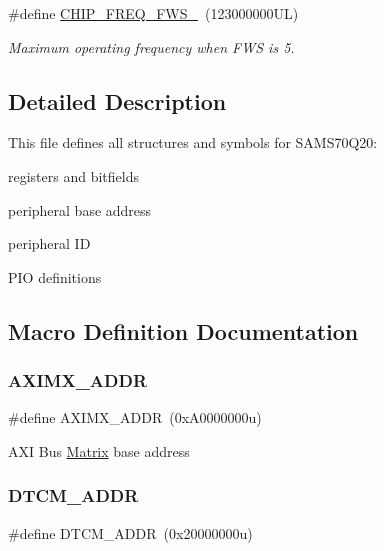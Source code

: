 \begin{DoxyCompactItemize}
\mbox{\label{group__SAMS70Q20__definitions_ga3b66824f858591135877b369f98d48a5}} 
\#define \mbox{\hyperlink{group__SAMS70Q20__definitions_ga3b66824f858591135877b369f98d48a5}{C\+H\+I\+P\+\_\+\+F\+R\+E\+Q\+\_\+\+F\+W\+S\+\_}}~(123000000\+U\+L)
\begin{DoxyCompactList}\small\item\em Maximum operating frequency when F\+WS is 5. \end{DoxyCompactList}\end{DoxyCompactItemize}


\subsection{Detailed Description}
This file defines all structures and symbols for S\+A\+M\+S70\+Q20\+:
\begin{DoxyItemize}
\item registers and bitfields
\item peripheral base address
\item peripheral ID
\item P\+IO definitions 
\end{DoxyItemize}

\subsection{Macro Definition Documentation}
\mbox{\label{group__SAMS70Q20__definitions_ga2fb7cc681bf5e7fbce5e3635b72a330a}} 
\subsubsection{\texorpdfstring{AXIMX\_ADDR}{AXIMX\_ADDR}}
{\footnotesize\ttfamily \#define A\+X\+I\+M\+X\+\_\+\+A\+D\+DR~(0x\+A0000000u)}

A\+XI Bus \mbox{\hyperlink{structMatrix}{Matrix}} base address \mbox{\label{group__SAMS70Q20__definitions_ga26626a425f7ebb3a0c2dbc276f0d9f78}} 
\subsubsection{\texorpdfstring{DTCM\_ADDR}{DTCM\_ADDR}}
{\footnotesize\ttfamily \#define D\+T\+C\+M\+\_\+\+A\+D\+DR~(0x20000000u)}

